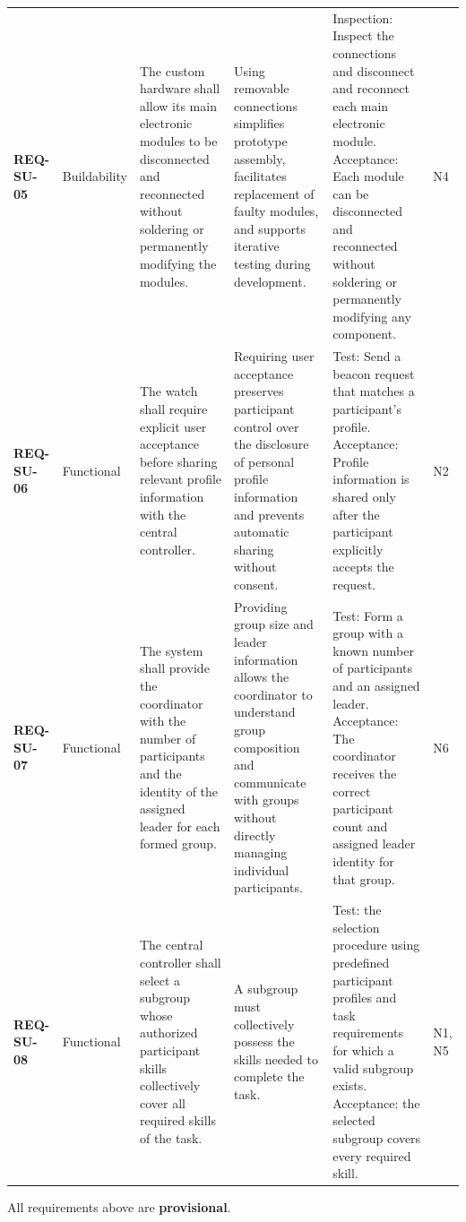 \documentclass[10pt]{article}
\begin{document}
\begin{center}
\begin{tabularx}{\linewidth}{@{}p{1.25cm} p{1.5cm} X X X p{0.8cm}@{}}
\textbf{REQ-SU-05} &
Buildability &
The custom hardware shall allow its main electronic modules to be disconnected and reconnected without soldering or permanently modifying the modules. &
Using removable connections simplifies prototype assembly, facilitates replacement of faulty modules, and supports iterative testing during development. &
Inspection: Inspect the connections and disconnect and reconnect each main electronic module. Acceptance: Each module can be disconnected and reconnected without soldering or permanently modifying any component. &
N4 \\
\textbf{REQ-SU-06} &
Functional &
The watch shall require explicit user acceptance before sharing relevant profile information with the central controller. &
Requiring user acceptance preserves participant control over the disclosure of personal profile information and prevents automatic sharing without consent. &
Test: Send a beacon request that matches a participant's profile. Acceptance: Profile information is shared only after the participant explicitly accepts the request. &
N2 \\
\textbf{REQ-SU-07} &
Functional &
The system shall provide the coordinator with the number of participants and the identity of the assigned leader for each formed group. &
Providing group size and leader information allows the coordinator to understand group composition and communicate with groups without directly managing individual participants. &
Test: Form a group with a known number of participants and an assigned leader. Acceptance: The coordinator receives the correct participant count and assigned leader identity for that group. &
N6 \\
\textbf{REQ-SU-08} & Functional & The central controller shall select a subgroup whose authorized participant skills collectively cover all required skills of the task. & A subgroup must collectively possess the skills needed to complete the task. & Test: the selection procedure using predefined participant profiles and task requirements for which a valid subgroup exists. Acceptance: the selected subgroup covers every required skill. & N1, N5 \\
\bottomrule
\end{tabularx}
\end{center}
All requirements above are \textbf{provisional}.

\end{document}
